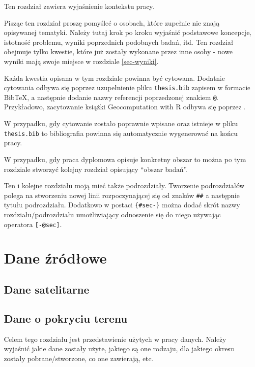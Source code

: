 \documentclass{amuthesis}
\begin{document}
Ten rozdział zawiera wyjaśnienie kontekstu pracy.

Pisząc ten rozdział proszę pomyśleć o osobach, które zupełnie nie znają
opisywanej tematyki. Należy tutaj krok po kroku wyjaśnić podstawowe
koncepcje, istotność problemu, wyniki poprzednich podobnych badań, itd.
Ten rozdział obejmuje tylko kwestie, które już zostały wykonane przez
inne osoby - nowe wyniki mają swoje miejsce w rozdziale
\ref{sec-wyniki}.

Każda kwestia opisana w tym rozdziale powinna być cytowana. Dodatnie
cytowania odbywa się poprzez uzupełnienie pliku \texttt{thesis.bib}
zapisem w formacie BibTeX, a następnie dodanie nazwy referencji
poprzedzonej znakiem \texttt{@}. Przykładowo, zacytowanie książki
Geocomputation with R odbywa się poprzez
\autocite{lovelace_geocomputation_2019}.

W przypadku, gdy cytowanie zostało poprawnie wpisane oraz istnieje w
pliku \texttt{thesis.bib} to bibliografia powinna się automatycznie
wygenerować na końcu pracy.

W przypadku, gdy praca dyplomowa opisuje konkretny obszar to można po
tym rozdziale stworzyć kolejny rozdział opisujący ``obszar badań''.

Ten i kolejne rozdziału moją mieć także podrozdziały. Tworzenie
podrozdziałów polega na stworzeniu nowej linii rozpoczynającej się od
znaków \texttt{\#\#} a następnie tytułu podrozdziału. Dodatkowo w
postaci \texttt{\{\#sec-\}} można dodać skrót nazwy
rozdziału/podrozdziału umożliwiający odnoszenie się do niego używając
operatora \texttt{{[}-@sec{]}}.


\hypertarget{sec-dane}{%
\chapter{Dane źródłowe}\label{sec-dane}}

\hypertarget{sec-sat}{%
\section{Dane satelitarne}\label{sec-sat}}

\hypertarget{sec-landcover}{%
\section{Dane o pokryciu terenu}\label{sec-landcover}}

Celem tego rozdziału jest przedstawienie użytych w pracy danych. Należy
wyjaśnić jakie dane zostały użyte, jakiego są one rodzaju, dla jakiego
okresu zostały pobrane/stworzone, co one zawierają, etc.
\end{document}
